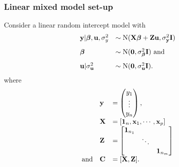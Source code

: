 \documentclass{beamer}
\begin{document}
\begin{frame}
	\frametitle{Linear mixed model set-up}
	
	Consider a linear random intercept model with
	$$
	\begin{array}{ll}
		{\bf y}|{\boldsymbol \beta},{\bf u},\sigma_y^2 & \sim \text{N}({\bf X} {\boldsymbol \beta} + {\bf Z} {\bf u}, \sigma_{\bf y}^2 {\bf I})  \\[2ex]
		{\boldsymbol\beta}                    & \sim \text{N}({\bf 0}, \sigma_{\boldsymbol \beta}^2 {\bf I}) \text{ and} \\[2ex]
		{\bf u}|\sigma_{{\bf u}}^2        & \sim \text{N}({\bf 0}, \sigma_{{\bf u}}^2 {\bf I}).             
	\end{array}
	$$
	\noindent where
	$$
	\begin{array}{rll}
		            & {\bf y}    & =                                 
		\begin{pmatrix}
		y_1 \\
		\vdots \\
		y_n
		\end{pmatrix}, \\[2ex]
		            & {\bf X}    & = [{\bf 1}_n, {\bf x}_1, \cdots, {\bf x}_p] \\
		            & {\bf Z}    & =                                 
		\begin{bmatrix}
		{\bf1}_{n_1} &        &                                   \\
		            & \ddots &                                   \\
		            &        & {\bf 1}_{n_m}                       
		\end{bmatrix} \\
		\text{and}  & {\bf C}    & = [{\bf X}, {\bf Z}].                     
	\end{array}
	$$
\end{frame}
\end{document}
